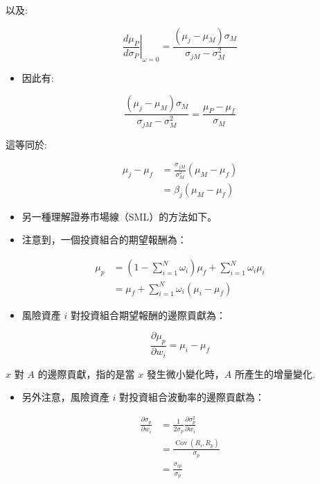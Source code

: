 \documentclass[letterpaper]{article}
\begin{document}
以及:

$$
\left.\frac{d \mu_{P}}{d \sigma_{P}}\right|_{\omega=0}=\frac{\left(\mu_{j}-\mu_{M}\right) \sigma_{M}}{\sigma_{j M}-\sigma_{M}^{2}}
$$

\begin{itemize}
  \item 因此有:
\end{itemize}

$$
\frac{\left(\mu_{j}-\mu_{M}\right) \sigma_{M}}{\sigma_{j M}-\sigma_{M}^{2}}=\frac{\mu_{P}-\mu_{f}}{\sigma_{M}}
$$

這等同於:

$$
\begin{aligned}
\mu_{j}-\mu_{f} & =\frac{\sigma_{j M}}{\sigma_{M}^{2}}\left(\mu_{M}-\mu_{f}\right) \\
& =\beta_{j}\left(\mu_{M}-\mu_{f}\right)
\end{aligned}
$$

\begin{itemize}
	\item 另一種理解證券市場線（SML）的方法如下。
	\item 注意到，一個投資組合的期望報酬為：
\end{itemize}


$$
\begin{aligned}
\mu_{p} & =\left(1-\sum_{i=1}^{N} \omega_{i}\right) \mu_{f}+\sum_{i=1}^{N} \omega_{i} \mu_{i} \\
& =\mu_{f}+\sum_{i=1}^{N} \omega_{i}\left(\mu_{i}-\mu_{f}\right)
\end{aligned}
$$

\begin{itemize}
	\item 風險資產 $i$ 對投資組合期望報酬的邊際貢獻為：
\end{itemize}


$$
\frac{\partial \mu_{p}}{\partial w_{i}}=\mu_{i}-\mu_{f}
$$

$x$ 對 $A$ 的邊際貢獻，指的是當 $x$ 發生微小變化時，$A$ 所產生的增量變化.


\begin{itemize}
	\item 另外注意，風險資產 $i$ 對投資組合波動率的邊際貢獻為：
\end{itemize}

$$
\begin{aligned}
\frac{\partial \sigma_{p}}{\partial w_{i}} & =\frac{1}{2 \sigma_{p}} \frac{\partial \sigma_{p}^{2}}{\partial w_{i}} \\
& =\frac{\operatorname{Cov}\left(R_{i}, R_{p}\right)}{\sigma_{p}} \\
& =\frac{\sigma_{i p}}{\sigma_{p}}
\end{aligned}
$$
\end{document}
